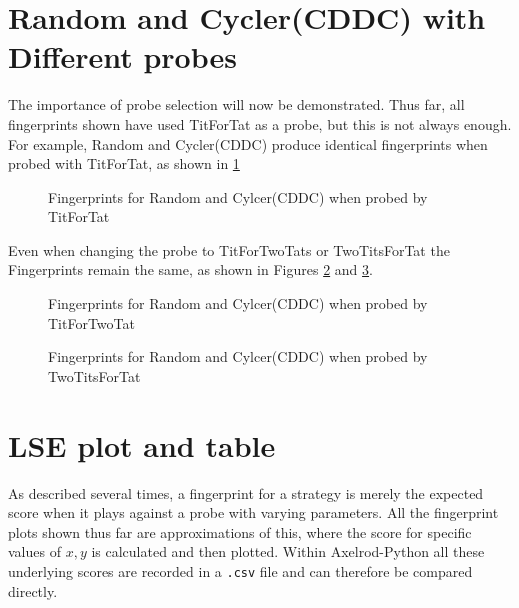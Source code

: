 \section{Random and Cycler(CDDC) with Different probes}

The importance of probe selection will now be demonstrated.
Thus far, all fingerprints shown have used TitForTat as a probe, but this is not always enough.
For example, Random and Cycler(CDDC) produce identical fingerprints when probed with TitForTat, as shown in \ref{fig:rand_cycle_tft}

\begin{figure}[htbp!]
    \centering
    \caption{Fingerprints for Random and Cylcer(CDDC) when probed by TitForTat}
    \label{fig:rand_cycle_tft}
\end{figure}

Even when changing the probe to TitForTwoTats or TwoTitsForTat the Fingerprints remain the same, as shown in Figures \ref{fig:rand_cycle_tf2t} and \ref{fig:rand_cycle_2tft}.

\begin{figure}[htbp!]
    \centering
    \caption{Fingerprints for Random and Cylcer(CDDC) when probed by TitForTwoTat}
    \label{fig:rand_cycle_tf2t}
\end{figure}

\begin{figure}[htbp!]
    \centering
    \caption{Fingerprints for Random and Cylcer(CDDC) when probed by TwoTitsForTat}
    \label{fig:rand_cycle_2tft}
\end{figure}



\section{LSE plot and table}\label{sec:lse}
As described several times, a fingerprint for a strategy is merely the expected score when it plays against a probe with varying parameters.
All the fingerprint plots shown thus far are approximations of this, where the score for specific values of $x, y$ is calculated and then plotted.
Within Axelrod-Python all these underlying scores are recorded in a \texttt{.csv} file and can therefore be compared directly.

